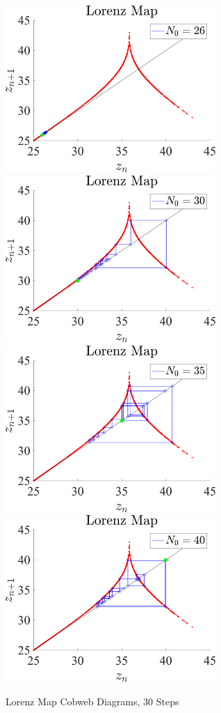 \documentclass[11pt]{article}
\begin{document}
\begin{figure}[h]
\centering
\includegraphics[width=8cm]{Lorenz_map_cobwebs_No26_ld.png}
\includegraphics[width=8cm]{Lorenz_map_cobwebs_No30_ld.png}
\includegraphics[width=8cm]{Lorenz_map_cobwebs_No35_ld.png}
\includegraphics[width=8cm]{Lorenz_map_cobwebs_No40_ld.png}
\caption{Lorenz Map Cobweb Diagrams, 30 Steps}
\end{figure}
\end{document}

